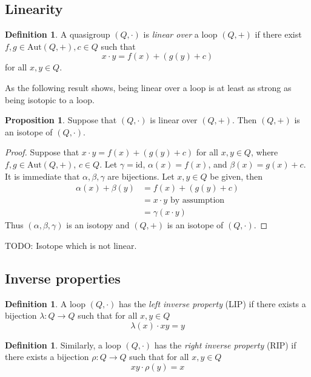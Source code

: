 \documentclass[12pt]{report}
\theoremstyle{definition}
\newtheorem{prp}[thm]{Proposition}
\newtheorem{dfn}[thm]{Definition}
\newcommand{\aut}{\mathrm{Aut}}     %
\newcommand{\id}{\mathrm{id}}       %
\begin{document}
\subsection{Linearity}

\begin{dfn}
  A quasigroup $(Q, \cdot)$ is \emph{linear over} a loop $(Q, +)$ if there exist $f, g\in \aut(Q, +), c\in Q$ such that
  \[x\cdot y = f(x) + (g(y) + c)\]
  for all $x, y\in Q$.
\end{dfn}

As the following result shows, being linear over a loop is at least as strong as being isotopic to a loop.

\begin{prp}\label{prp-linear-iso}
  Suppose that $(Q, \cdot)$ is linear over $(Q, +)$. Then $(Q, +)$ is an isotope of $(Q, \cdot)$.
\end{prp}

\begin{proof}
  Suppose that $x\cdot y = f(x) + (g(y) + c)$ for all $x, y\in Q$, where $f, g\in \aut(Q, +)$, $c\in Q$. Let $\gamma = \id$,
    $\alpha(x) = f(x)$, and $\beta(x) = g(x) + c$. It is immediate that $\alpha, \beta, \gamma$ are bijections.
    Let $x, y\in Q$ be given, then
  \begin{align*}
    \alpha(x) + \beta(y) &= f(x) + (g(y) + c)\\
    &= x\cdot y\text{ by assumption}\\
    &= \gamma(x\cdot y)
  \end{align*}
  Thus $(\alpha, \beta, \gamma)$ is an isotopy and $(Q, +)$ is an isotope of $(Q, \cdot)$.
\end{proof}

TODO: Isotope which is not linear.

\subsection{Inverse properties}

\begin{dfn}
  A loop $(Q, \cdot)$ has the \emph{left inverse property} (LIP) if there exists a bijection $\lambda: Q\to Q$ such
    that for all $x, y\in Q$
  \[\lambda(x)\cdot xy = y\]
\end{dfn}

\begin{dfn}
  Similarly, a loop $(Q, \cdot)$ has the \emph{right inverse property} (RIP) if there exists a bijection $\rho: Q\to Q$
    such that for all $x, y\in Q$
  \[xy\cdot \rho(y) = x\]
\end{dfn}
\end{document}
